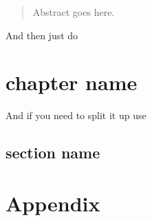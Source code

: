 \documentclass[12pt,a4paper,titlepage]{report}
\begin{document}

\begin{abstract}
Abstract goes here.
\end{abstract}

\tableofcontents
\pagebreak

And then just do \chapter{chapter name}
And if you need to split it up use \section{section name}

\appendix
\chapter{Appendix}
\end{document}
